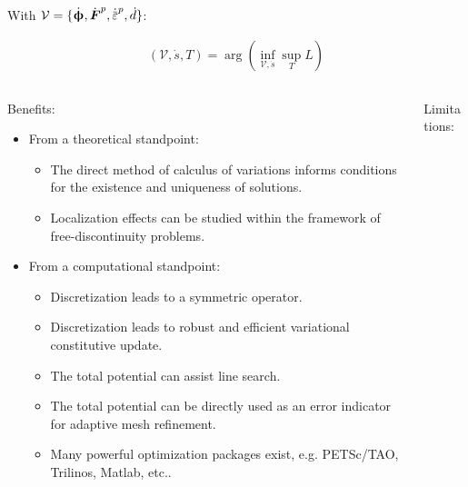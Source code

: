 \begin{frame}
  With $\mathcal{V} = \{ \defrate, \dot{\defgrad}^p, \epdot, \dot{d} \}$:
  \begin{block}{}
    \vspace{-0.5em}
    \begin{align*}
      \left( \mathcal{V}, \dot{s}, T \right) = \arg \left( \inf_{\mathcal{V}, \dot{s}} \sup_T L \right)
    \end{align*}
  \end{block}
  
  \begin{columns}
    \pause
    \begin{column}{0.6\textwidth}
      Benefits:
      \begin{itemize}
        \item From a theoretical standpoint:
              \begin{itemize}
                \item The direct method of \textcolor{peggyblue}{calculus of variations} informs conditions for the existence and uniqueness of solutions.
                \item Localization effects can be studied within the framework of \textcolor{peggyblue}{free-discontinuity problems}.
              \end{itemize}
        \item From a computational standpoint:
              \begin{itemize}
                \item Discretization leads to a \textcolor{peggyblue}{symmetric operator}.
                \item Discretization leads to robust and efficient variational constitutive update.
                \item The total potential can assist \textcolor{peggyblue}{line search}.
                \item The total potential can be directly used as an \textcolor{peggyblue}{error indicator} for adaptive mesh refinement.
                \item Many powerful optimization packages exist, e.g. PETSc/TAO, Trilinos, Matlab, etc..
              \end{itemize}
      \end{itemize}
    \end{column}
    \pause
    \begin{column}{0.4\textwidth}
      Limitations:
      \begin{itemize}

\end{itemize}
\end{column}
\end{columns}
\end{frame}
